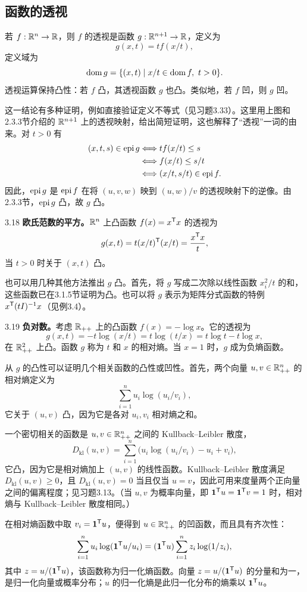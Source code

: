 \subsection{函数的透视}
若 $f:\mathbb R^n\to\mathbb R$，则 $f$ 的透视是函数 $g:\mathbb R^{n+1}\to\mathbb R$，定义为
\[g(x,t)=tf(x/t),\]
定义域为
\[\dom g=\{(x,t)\mid x/t\in\dom f,\ t>0\}.\]
透视运算保持凸性：若 $f$ 凸，其透视函数 $g$ 也凸。类似地，若 $f$ 凹，则 $g$ 凹。

这一结论有多种证明，例如直接验证定义不等式（见习题3.33）。这里用上图和2.3.3节介绍的 $\mathbb R^{n+1}$ 上的透视映射，给出简短证明，这也解释了“透视”一词的由来。对 $t>0$ 有
\[
\begin{aligned}
 (x,t,s)\in\operatorname{epi} g&\Longleftrightarrow tf(x/t)\leq s\\
 &\Longleftrightarrow f(x/t)\leq s/t\\
 &\Longleftrightarrow(x/t,s/t)\in\operatorname{epi} f.
\end{aligned}
\]
因此，$\operatorname{epi} g$ 是 $\operatorname{epi} f$ 在将 $(u,v,w)$ 映到 $(u,w)/v$ 的透视映射下的逆像。由2.3.3节，$\operatorname{epi} g$ 凸，故 $g$ 凸。
\begin{origexample}{3.18}
\textbf{欧氏范数的平方。}$\mathbb R^n$ 上凸函数 $f(x)=x^\mathsf T x$ 的透视为
\[g(x,t)=t(x/t)^\mathsf T(x/t)=\frac{x^\mathsf T x}{t},\]
当 $t>0$ 时关于 $(x,t)$ 凸。

也可以用几种其他方法推出 $g$ 凸。首先，将 $g$ 写成二次除以线性函数 $x_i^2/t$ 的和，这些函数已在3.1.5节证明为凸。也可以将 $g$ 表示为矩阵分式函数的特例 $x^\mathsf T(tI)^{-1}x$（见例3.4）。
\end{origexample}
\begin{origexample}{3.19}
\textbf{负对数。}考虑 $\mathbb R_{++}$ 上的凸函数 $f(x)=-\log x$。它的透视为
\[g(x,t)=-t\log(x/t)=t\log(t/x)=t\log t-t\log x,\]
在 $\mathbb R_{++}^2$ 上凸。函数 $g$ 称为 $t$ 和 $x$ 的相对熵。当 $x=1$ 时，$g$ 成为负熵函数。

从 $g$ 的凸性可以证明几个相关函数的凸性或凹性。首先，两个向量 $u,v\in\mathbb R_{++}^n$ 的相对熵定义为
\[\sum_{i=1}^n u_i\log(u_i/v_i),\]
它关于 $(u,v)$ 凸，因为它是各对 $u_i,v_i$ 相对熵之和。

一个密切相关的函数是 $u,v\in\mathbb R_{++}^n$ 之间的 Kullback--Leibler 散度，
\begin{equation}
 D_{\mathrm{kl}}(u,v)=\sum_{i=1}^n\bigl(u_i\log(u_i/v_i)-u_i+v_i\bigr),\tag{3.17}
\end{equation}
它凸，因为它是相对熵加上 $(u,v)$ 的线性函数。Kullback--Leibler 散度满足 $D_{\mathrm{kl}}(u,v)\geq0$，且 $D_{\mathrm{kl}}(u,v)=0$ 当且仅当 $u=v$，因此可用来度量两个正向量之间的偏离程度；见习题3.13。（当 $u,v$ 为概率向量，即 $\mathbf 1^\mathsf T u=\mathbf 1^\mathsf T v=1$ 时，相对熵与 Kullback--Leibler 散度相同。）

在相对熵函数中取 $v_i=\mathbf 1^\mathsf T u$，便得到 $u\in\mathbb R_{++}^n$ 的凹函数，而且具有齐次性：
\[\sum_{i=1}^n u_i\log(\mathbf 1^\mathsf T u/u_i)=(\mathbf 1^\mathsf T u)\sum_{i=1}^n z_i\log(1/z_i),\]
其中 $z=u/(\mathbf 1^\mathsf T u)$，该函数称为归一化熵函数。向量 $z=u/(\mathbf 1^\mathsf T u)$ 的分量和为一，是归一化向量或概率分布；$u$ 的归一化熵是此归一化分布的熵乘以 $\mathbf 1^\mathsf T u$。
\end{origexample}
